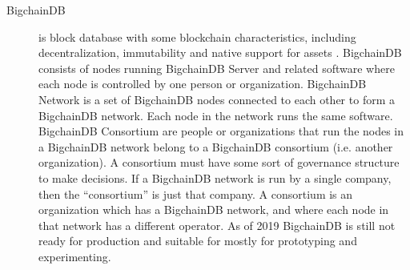 \begin{description}
\item[BigchainDB] is block database with some blockchain characteristics, including decentralization, immutability and native support for assets \cite{bigchaindb}. BigchainDB consists of nodes running BigchainDB Server and related software where each node is controlled by one person or organization. BigchainDB Network is a set of BigchainDB nodes connected to each other to form a BigchainDB network. Each node in the network runs the same software. BigchainDB Consortium are people or organizations that run the nodes in a BigchainDB network belong to a BigchainDB consortium (i.e. another organization). A consortium must have some sort of governance structure to make decisions. If a BigchainDB network is run by a single company, then the “consortium” is just that company. A consortium is an organization which has a BigchainDB network, and where each node in that network has a different operator. As of 2019 BigchainDB is still not ready for production and suitable for mostly for prototyping and experimenting.

\end{description}